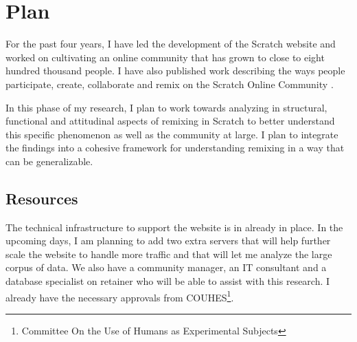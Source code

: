 \chapter{Plan}

For the past four years, I have led the development of the Scratch website and worked on cultivating an online community that has grown to close to eight hundred thousand people.
I have also published work describing the ways people participate, create, collaborate and remix on the Scratch Online Community \citep{monroy-hernandez_scratchr:_2007, monroy-hernandez_empowering_2008, monroy-hernandez_computers_2011, hill_responses_2010, aragon_tale_2009, nickerson_appropriation_2011, brennan_making_2010}.

In this phase of my research, I plan to work towards analyzing in structural, functional and attitudinal aspects of remixing in Scratch to better understand this specific phenomenon as well as the community at large.
I plan to integrate the findings into a cohesive framework for understanding remixing in a way that can be generalizable.

\section{Resources}
The technical infrastructure to support the website is in already in place.
In the upcoming days, I am planning to add two extra servers that will help further scale the website to handle more traffic and that will let me analyze the large corpus of data.
We also have a community manager, an IT consultant and a database specialist on retainer who will be able to assist with this research.
I already have the necessary approvals from COUHES\footnote{Committee On the Use of Humans as Experimental Subjects}.

